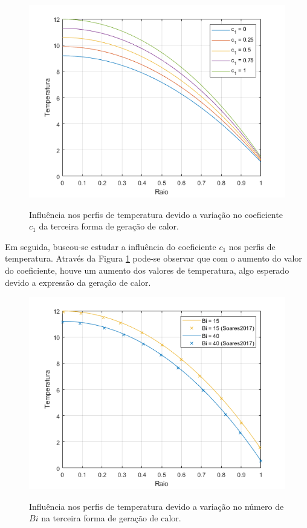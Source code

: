 \begin{figure}[H]
    \centering
    \caption{Influência nos perfis de temperatura devido a variação no coeficiente \(c_1\) da terceira forma de geração de calor.}
    \includegraphics[scale=0.7]{figures/results/Fig10.png}
    \label{fig:influence_of_coefficient_c1}
\end{figure}

Em seguida, buscou-se estudar a influência do coeficiente \(c_1\) nos perfis de temperatura. Através da Figura \ref{fig:influence_of_coefficient_c1} pode-se observar que com o aumento do valor do coeficiente, houve um aumento dos valores de temperatura, algo esperado devido a expressão da geração de calor.

\begin{figure}[H]
    \centering
    \caption{Influência nos perfis de temperatura devido a variação no número de \(Bi\) na terceira forma de geração de calor.}
    \includegraphics[scale=0.7]{figures/results/Fig11.png}
    \label{fig:influence_of_Biot_on_third_heat_generation}
\end{figure}

